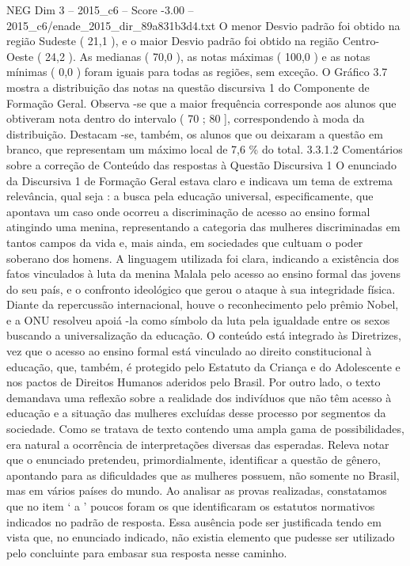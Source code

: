 \begin{textsample}{NEG Dim 3 – 2015\_c6 – Score -3.00 – 2015\_c6/enade\_2015\_dir\_89a831b3d4.txt}
O menor Desvio padrão foi obtido na região Sudeste ( 21,1 ), e o maior Desvio padrão foi obtido na região Centro-Oeste ( 24,2 ).
As medianas ( 70,0 ), as notas máximas ( 100,0 ) e as notas mínimas ( 0,0 ) foram iguais para todas as regiões, sem exceção.
O Gráfico 3.7 mostra a distribuição das notas na questão discursiva 1 do Componente de Formação Geral.
Observa -se que a maior frequência corresponde aos alunos que obtiveram nota dentro do intervalo ( 70 ; 80 ], correspondendo à moda da distribuição.
Destacam -se, também, os alunos que ou deixaram a questão em branco, que representam um máximo local de 7,6 \% do total. 3.3.1.2 Comentários sobre a correção de Conteúdo das respostas à Questão Discursiva 1 O enunciado da Discursiva 1 de Formação Geral estava claro e indicava um tema de extrema relevância, qual seja : a busca pela educação universal, especificamente, que apontava um caso onde ocorreu a discriminação de acesso ao ensino formal atingindo uma menina, representando a categoria das mulheres discriminadas em tantos campos da vida e, mais ainda, em sociedades que cultuam o poder soberano dos homens.
A linguagem utilizada foi clara, indicando a existência dos fatos vinculados à luta da menina Malala pelo acesso ao ensino formal das jovens do seu país, e o confronto ideológico que gerou o ataque à sua integridade física.
Diante da repercussão internacional, houve o reconhecimento pelo prêmio Nobel, e a ONU resolveu apoiá -la como símbolo da luta pela igualdade entre os sexos buscando a universalização da educação.
O conteúdo está integrado às Diretrizes, vez que o acesso ao ensino formal está vinculado ao direito constitucional à educação, que, também, é protegido pelo Estatuto da Criança e do Adolescente e nos pactos de Direitos Humanos aderidos pelo Brasil.
Por outro lado, o texto demandava uma reflexão sobre a realidade dos indivíduos que não têm acesso à educação e a situação das mulheres excluídas desse processo por segmentos da sociedade.
Como se tratava de texto contendo uma ampla gama de possibilidades, era natural a ocorrência de interpretações diversas das esperadas.
Releva notar que o enunciado pretendeu, primordialmente, identificar a questão de gênero, apontando para as dificuldades que as mulheres possuem, não somente no Brasil, mas em vários países do mundo.
Ao analisar as provas realizadas, constatamos que no item ‘ a ’ poucos foram os que identificaram os estatutos normativos indicados no padrão de resposta.
Essa ausência pode ser justificada tendo em vista que, no enunciado indicado, não existia elemento que pudesse ser utilizado pelo concluinte para embasar sua resposta nesse caminho.

\end{textsample}
